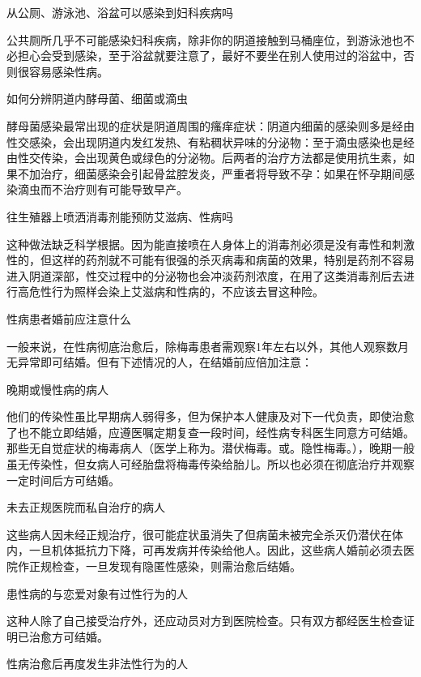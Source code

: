\documentclass[12pt,UTF8]{ctexbook}
\begin{document}
从公厕、游泳池、浴盆可以感染到妇科疾病吗


公共厕所几乎不可能感染妇科疾病，除非你的阴道接触到马桶座位，到游泳池也不必担心会受到感染，至于浴盆就要注意了，最好不要坐在别人使用过的浴盆中，否则很容易感染性病。





如何分辨阴道内酵母菌、细菌或滴虫


酵母菌感染最常出现的症状是阴道周围的瘙痒症状：阴道内细菌的感染则多是经由性交感染，会出现阴道内发红发热、有粘稠状异味的分泌物：至于滴虫感染也是经由性交传染，会出现黄色或绿色的分泌物。后两者的治疗方法都是使用抗生素，如果不加治疗，细菌感染会引起骨盆腔发炎，严重者将导致不孕：如果在怀孕期间感染滴虫而不治疗则有可能导致早产。





往生殖器上喷洒消毒剂能预防艾滋病、性病吗


这种做法缺乏科学根据。因为能直接喷在人身体上的消毒剂必须是没有毒性和刺激性的，但这样的药剂就不可能有很强的杀灭病毒和病菌的效果，特别是药剂不容易进入阴道深部，性交过程中的分泌物也会冲淡药剂浓度，在用了这类消毒剂后去进行高危性行为照样会染上艾滋病和性病的，不应该去冒这种险。





性病患者婚前应注意什么


一般来说，在性病彻底治愈后，除梅毒患者需观察1年左右以外，其他人观察数月无异常即可结婚。但有下述情况的人，在结婚前应倍加注意：

晚期或慢性病的病人

他们的传染性虽比早期病人弱得多，但为保护本人健康及对下一代负责，即使治愈了也不能立即结婚，应遵医嘱定期复查一段时间，经性病专科医生同意方可结婚。那些无自觉症状的梅毒病人（医学上称为。潜伏梅毒。或。隐性梅毒。），晚期一般虽无传染性，但女病人可经胎盘将梅毒传染给胎儿。所以也必须在彻底治疗并观察一定时间后方可结婚。

未去正规医院而私自治疗的病人

这些病人因未经正规治疗，很可能症状虽消失了但病菌未被完全杀灭仍潜伏在体内，一旦机体抵抗力下降，可再发病并传染给他人。因此，这些病人婚前必须去医院作正规检查，一旦发现有隐匿性感染，则需治愈后结婚。

患性病的与恋爱对象有过性行为的人

这种人除了自己接受治疗外，还应动员对方到医院检查。只有双方都经医生检查证明已治愈方可结婚。

性病治愈后再度发生非法性行为的人
\end{document}
